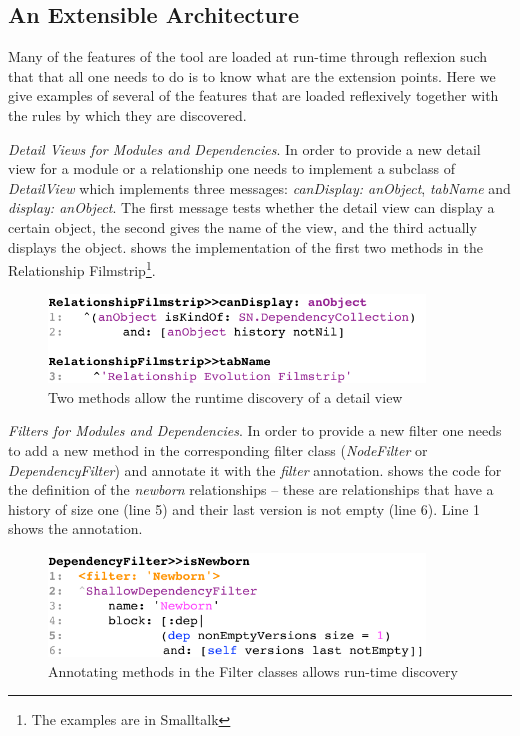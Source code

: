 \documentclass[preprint,12pt]{elsarticle}
\newcommand{\cd}[1]{{\em{#1}}}
\begin{document}
\subsection {An Extensible Architecture}
Many of the features of the tool are loaded at run-time through reflexion such that that all one needs to do is to know what are the extension points. Here we give examples of several of the features that are loaded reflexively together with the rules by which they are discovered.

\begin{description}
\item {\em Detail Views for Modules and Dependencies}. In order to provide a new detail view for a module or a relationship one needs to implement a subclass of {\em DetailView} which implements three messages: \cd{canDisplay: anObject}, \cd{tabName} and \cd{display: anObject}. The first message tests whether the detail view can display a certain object, the second gives the name of the view, and the third actually displays the object.  shows the implementation of the first two methods in the Relationship Filmstrip\footnote{The examples are in Smalltalk}.

\begin{figure}[h]
\begin{center}
\includegraphics[width=10cm]{images/filmstrip-sample}
\caption{Two methods allow the runtime discovery of a detail view}
\end{center}
\end{figure}

\item {\em Filters for Modules and Dependencies}. In order to provide a new filter one needs to add a new method in the corresponding filter class (\cd{NodeFilter} or \cd{DependencyFilter}) and annotate it with the \cd{filter} annotation.  shows the code for the definition of the {\em newborn} relationships -- these are relationships that have a history of size one (line 5) and their last version is not empty (line 6). Line 1 shows the annotation.

\begin{figure}[h]
\begin{center}
\includegraphics[width=10cm]{images/filter-sample}
\caption{Annotating methods in the Filter classes allows run-time discovery}
\end{center}
\end{figure}



\end{description}
\end{document}
